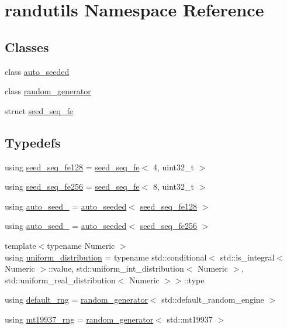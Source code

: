 \hypertarget{namespacerandutils}{}\section{randutils Namespace Reference}
\label{namespacerandutils}
\subsection*{Classes}
\begin{DoxyCompactItemize}
\item 
class \hyperlink{classrandutils_1_1auto__seeded}{auto\+\_\+seeded}
\item 
class \hyperlink{classrandutils_1_1random__generator}{random\+\_\+generator}
\item 
struct \hyperlink{structrandutils_1_1seed__seq__fe}{seed\+\_\+seq\+\_\+fe}
\end{DoxyCompactItemize}
\subsection*{Typedefs}
\begin{DoxyCompactItemize}
\item 
using \hyperlink{namespacerandutils_a2b7c80226592f2cfc2dd51ef1b6a6648}{seed\+\_\+seq\+\_\+fe128} = \hyperlink{structrandutils_1_1seed__seq__fe}{seed\+\_\+seq\+\_\+fe}$<$ 4, uint32\+\_\+t $>$
\item 
using \hyperlink{namespacerandutils_ab264470d8fc7505e72c78a33528108bd}{seed\+\_\+seq\+\_\+fe256} = \hyperlink{structrandutils_1_1seed__seq__fe}{seed\+\_\+seq\+\_\+fe}$<$ 8, uint32\+\_\+t $>$
\item 
using \hyperlink{namespacerandutils_ac122072eca2bd6dc81a557e59147099c}{auto\+\_\+seed\+\_} = \hyperlink{classrandutils_1_1auto__seeded}{auto\+\_\+seeded}$<$ \hyperlink{namespacerandutils_a2b7c80226592f2cfc2dd51ef1b6a6648}{seed\+\_\+seq\+\_\+fe128} $>$
\item 
using \hyperlink{namespacerandutils_a96647abcb6ceb1ef0c3cf7c8875ae298}{auto\+\_\+seed\+\_} = \hyperlink{classrandutils_1_1auto__seeded}{auto\+\_\+seeded}$<$ \hyperlink{namespacerandutils_ab264470d8fc7505e72c78a33528108bd}{seed\+\_\+seq\+\_\+fe256} $>$
\item 
{\footnotesize template$<$typename Numeric $>$ }\\using \hyperlink{namespacerandutils_ad441b52b9359829bc0e396b1eb484953}{uniform\+\_\+distribution} = typename std\+::conditional$<$ std\+::is\+\_\+integral$<$ Numeric $>$\+::value, std\+::uniform\+\_\+int\+\_\+distribution$<$ Numeric $>$, std\+::uniform\+\_\+real\+\_\+distribution$<$ Numeric $>$$>$\+::type
\item 
using \hyperlink{namespacerandutils_a541e8d25081229bd349f2a5facb915a1}{default\+\_\+rng} = \hyperlink{classrandutils_1_1random__generator}{random\+\_\+generator}$<$ std\+::default\+\_\+random\+\_\+engine $>$
\item 
using \hyperlink{namespacerandutils_a7ad409d0cae7ed019fd23cc64e3f764f}{mt19937\+\_\+rng} = \hyperlink{classrandutils_1_1random__generator}{random\+\_\+generator}$<$ std\+::mt19937 $>$
\end{DoxyCompactItemize}


